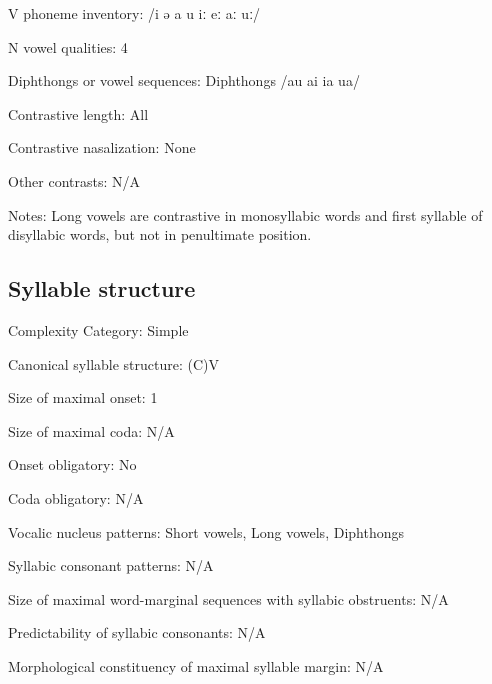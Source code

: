 {\begin{appendixdesc}
\item[V phoneme inventory:] /i ə a u iː eː aː uː/

\item[N vowel qualities:] 4

\item[Diphthongs or vowel sequences:] Diphthongs /au ai ia ua/

\item[Contrastive length:] All

\item[Contrastive nasalization:] None

\item[Other contrasts:] N/A

\item[Notes:] Long vowels are contrastive in monosyllabic words and first syllable of disyllabic words, but not in penultimate position.
\end{appendixdesc}
\subsection*{Syllable structure}
\begin{appendixdesc}

\item[Complexity Category:] Simple

\item[Canonical syllable structure:] (C)V \citep[211--218]{Chen2006}

\item[Size of maximal onset:] 1

\item[Size of maximal coda:] N/A

\item[Onset obligatory:] No

\item[Coda obligatory:] N/A

\item[Vocalic nucleus patterns:] Short vowels, Long vowels, Diphthongs

\item[Syllabic consonant patterns:] N/A

\item[Size of maximal word-marginal sequences with syllabic obstruents:] N/A

\item[Predictability of syllabic consonants:] N/A

\item[Morphological constituency of maximal syllable margin:] N/A


\end{appendixdesc}}
